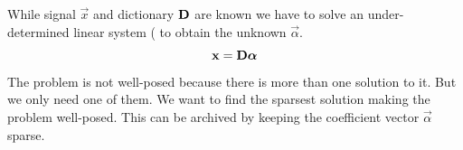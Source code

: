 While signal $\vec{x}$ and dictionary $\boldsymbol{\mathrm{D}}$ are known we have to solve an  
under-determined linear system ( to obtain the unknown
$\vec{\alpha}$.
\begin{equation}
 \boldsymbol{\mathrm{x}} = \boldsymbol{\mathrm{D}}\boldsymbol{\mathrm{\alpha}}\label{eq:problem} 
\end{equation}
The problem is not well-posed because there is more than one
solution to it. %
But we only need one of them. We want to find the sparsest
solution making the problem well-posed. This can be archived by keeping
the coefficient vector $\vec{\alpha}$ sparse. 





